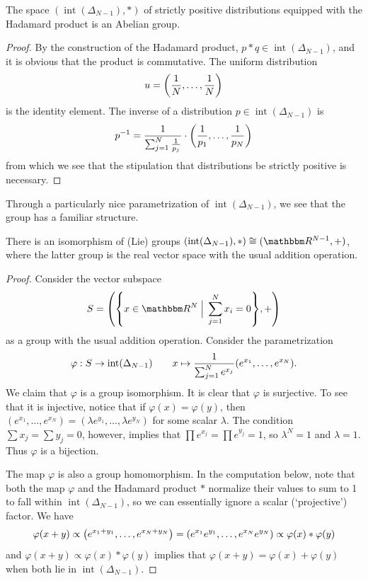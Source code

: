 \documentclass[11pt,titlepage]{article}
\DeclareMathOperator{\intr}{int}
\numberwithin{equation}{section}
\begin{document}
    \begin{theorem}
    The space $(\intr(\Delta_{N-1}), *)$ of strictly positive distributions
    equipped with the Hadamard product is an Abelian group.
    \end{theorem}
    \begin{proof}
    By the construction of the Hadamard product, $p * q \in
    \intr(\Delta_{N-1})$, and it is obvious that the product is commutative.
    The uniform distribution
    \[
        u = \pdil*{\frac 1 N, \ldots, \frac 1 N}
    \]
    is the identity element.  The inverse of a distribution $p \in
    \intr(\Delta_{N-1})$ is 
    \[
        \inv p = \frac{1}{\sum_{j=1}^N \frac 1 {p_j}}
        \cdot\pdil*{\frac 1 {p_1}, \ldots, \frac 1 {p_N}}
    \]
    from which we see that the stipulation that distributions be strictly
    positive is necessary.
    \end{proof}

    Through a particularly nice parametrization of $\intr(\Delta_{N-1})$, we see
    that the group has a familiar structure.
    \begin{theorem} \label{thm:dist-par}
    There is an isomorphism of (Lie) groups $(\intr(\Delta_{N-1}), *) \iso
    (\R^{N-1}, +)$, where the latter group is the real vector space with the
    usual addition operation.
    \end{theorem}
    \begin{proof}
    Consider the vector subspace
    \[
        S = \pdil*{\cdil*{x \in \R^N \;\Big\vert\; \sum_{j=1}^N x_i = 0 }, +}
    \]
    as a group with the usual addition operation.  Consider the parametrization
    \[
        \varphi : S \to \intr(\Delta_{N-1})
        \qquad
        x \mapsto \frac{1}{\sum_{j=1}^N e^{x_j}} 
        \pdil*{e^{x_1}, \ldots, e^{x_N}}.
    \]
    We claim that $\varphi$ is a group isomorphism.  It is clear that $\varphi$
    is surjective.  To see that it is injective, notice that if $\varphi(x) =
    \varphi(y)$, then $(e^{x_1}, \ldots, e^{x_N}) = (\lambda e^{y_1}, \ldots,
    \lambda e^{y_N})$ for some scalar $\lambda$.  The condition $\sum x_j = \sum
    y_j = 0$, however, implies that $\prod e^{x_j} = \prod e^{y_j} = 1$, so
    $\lambda^N = 1$ and $\lambda = 1$.  Thus $\varphi$ is a bijection.

    The map $\varphi$ is also a group homomorphism.  In the computation below,
    note that both the map $\varphi$ and the Hadamard product $*$ normalize
    their values to sum to 1 to fall within $\intr(\Delta_{N-1})$, so we can
    essentially ignore a scalar (`projective') factor.  We have
    \[
        \varphi(x + y)
        \propto
        \pdil*{e^{x_1 + y_1}, \ldots, e^{x_N + y_N}}
        =
        \pdil*{e^{x_1}e^{y_1}, \ldots, e^{x_N}e^{y_N}}
        \propto
        \varphi(x) * \varphi(y)
    \]
    and $\varphi(x + y) \propto \varphi(x) * \varphi(y)$ implies that $\varphi(x
    + y) = \varphi(x) + \varphi(y)$ when both lie in $\intr(\Delta_{N-1})$.
    \end{proof}
    
\end{document}
